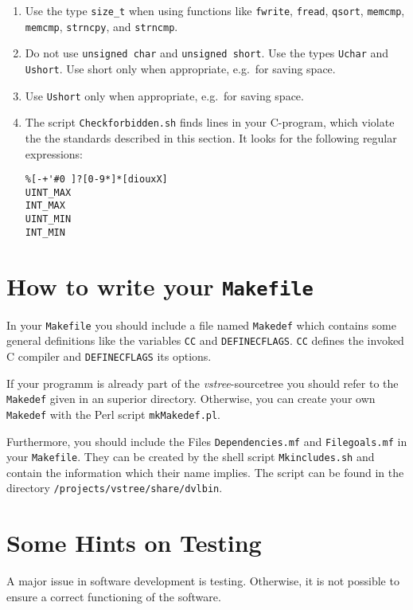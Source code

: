 \documentclass[12pt]{article}
\begin{document}
\begin{enumerate}
\begin{footnotesize}
\begin{verbatim}
  printf("%lu %ld\n",(Showuint) i,(Showsint) j); // for 32 and 64 bit
\end{verbatim}
\end{footnotesize}
\item
Use the type \texttt{size\_t} when using functions like \texttt{fwrite}, 
\texttt{fread}, \texttt{qsort}, \texttt{memcmp}, \texttt{memcmp}, 
\texttt{strncpy}, and \texttt{strncmp}.
\item
Do not use \texttt{unsigned char} and \texttt{unsigned short}. Use the
types \texttt{Uchar} and \texttt{Ushort}. Use short only when appropriate,
e.g.\ for saving space.
\item
Use \texttt{Ushort} only when appropriate, e.g.\ for saving space.
\item
The script \texttt{Checkforbidden.sh} finds lines in your
C-program, which violate the the standards described in this section.
It looks for the following regular expressions:
\begin{verbatim}
%[-+'#0 ]?[0-9*]*[diouxX]
UINT_MAX
INT_MAX
UINT_MIN
INT_MIN
\end{verbatim}
\end{enumerate}



\section{How to write your \texttt{Makefile}}
In your \texttt{Makefile} you should include a file named \texttt{Makedef}
which contains some general definitions like the variables \texttt{CC} 
and \texttt{DEFINECFLAGS}. \texttt{CC} defines the invoked C compiler and \texttt{DEFINECFLAGS} its options. 

If your programm is already part of the \emph{vstree}-sourcetree you should
refer to the \texttt{Makedef} given in an superior directory. Otherwise, you can create your own \texttt{Makedef} with the Perl script \texttt{mkMakedef.pl}.

Furthermore, you should include the Files \texttt{Dependencies.mf} and \texttt{Filegoals.mf} in your \texttt{Makefile}. They can be created by the shell script \texttt{Mkincludes.sh} and contain the information which their name implies.
The script can be found in the directory \texttt{/projects/vstree/share/dvlbin}.


\section{Some Hints on Testing}
A major issue in software development is testing. Otherwise, it is not possible to ensure a correct functioning of the software. 
\end{document}
